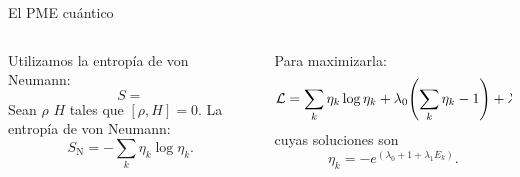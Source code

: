 \begin{frame}{El PME cuántico}
    \begin{columns}
        \begin{column}{0.5\textwidth}
            Utilizamos la entropía de von Neumann:
            \begin{equation}
                S=
            \end{equation}
            Sean $\rho$ $H$ tales que $[\rho,H]=0$. La entropía de von Neumann:
            \begin{equation}
                S_{\text{N}}=-\sum_{k}\eta_{k}\log{\eta_{k}}.\nonumber
            \end{equation}
        \end{column}
        \begin{column}{0.5\textwidth}
            Para maximizarla:
            \begin{equation}
                \mathcal{L}=\sum_{k}\eta_{k}\log{\eta_{k}}+\lambda_{0}\qty(\sum_{k}\eta_{k}-1)+\lambda_{1}\qty(\sum_{k}\eta_{k}E_{k}-\expval{H}),\nonumber
            \end{equation}
            cuyas soluciones son
            \begin{equation}
                \eta_{k}=-e^{(\lambda_{0}+1+\lambda_{1}E_{k})}.\nonumber
            \end{equation}
        \end{column}
    \end{columns}
\end{frame}

